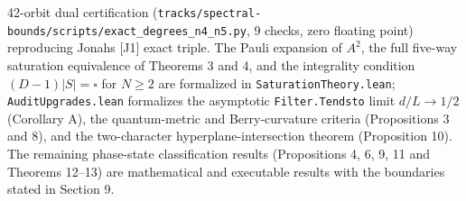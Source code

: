 \documentclass[11pt,a4paper]{article}
\begin{document}
42-orbit dual certification (\nolinkurl{tracks/spectral-bounds/scripts/exact_degrees_n4_n5.py}, 9 checks, zero floating point) reproducing
Jonah\textquotesingle s {[}J1{]} exact triple. The Pauli expansion of \(A^2\), the full five-way saturation equivalence of
Theorems 3 and 4, and the integrality condition \((D-1)|S|=\square\) for \(N\ge2\) are formalized in
\nolinkurl{SaturationTheory.lean}; \nolinkurl{AuditUpgrades.lean} formalizes the asymptotic \texttt{Filter.Tendsto} limit
\(d/L\to1/2\) (Corollary A), the quantum-metric and Berry-curvature criteria (Propositions 3 and 8), and
the two-character hyperplane-intersection theorem (Proposition 10). The remaining phase-state
classification results (Propositions 4, 6, 9, 11 and Theorems 12--13) are mathematical and executable
results with the boundaries stated in Section 9.
\end{document}

